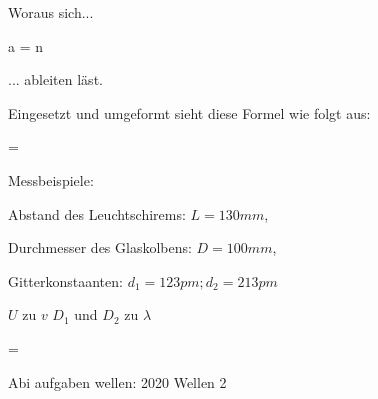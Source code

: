 Woraus sich...


\startformula
a \cdot \sin \alpha = n \cdot \lambda
\stopformula

... ableiten läst.

Eingesetzt und umgeformt sieht diese Formel wie folgt aus:

\startformula
\lambda = 
\stopformula


\startframedtask
Messbeispiele: 

\startitemize[packed]

\item Abstand des Leuchtschirems: $L = 130 mm$,
\item Durchmesser des Glaskolbens: $D = 100mm$,
\item Gitterkonstaanten: $d_1 = 123 pm; d_2 = 213 pm$

\stopitemize
\stopframedtask

\startframedtask
$U$ zu $v$
$D_1$ und $D_2$ zu $\lambda$
\stopframedtask

\startformula 
\lambda = 
 \stopformula


\stopsectionlevel


\startframedtipp
Abi aufgaben wellen: 2020 Wellen 2
\stopframedtipp
